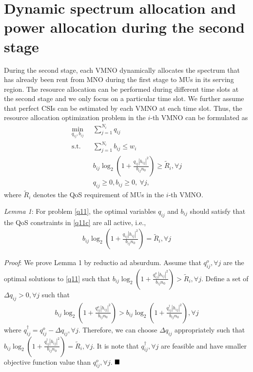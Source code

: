\documentclass[journal]{IEEEtran}
\begin{document}
\section{Dynamic spectrum allocation and power allocation during the second stage}
During the second stage, each VMNO dynamically allocates the spectrum that has already been rent from MNO during the first stage to MUs in its serving region. The resource allocation can be performed during different time slots at the second stage and we only focus on a particular time slot. We further assume that perfect CSIs can be estimated by each VMNO at each time slot. Thus, the resource allocation optimization problem in the $i$-th VMNO can be formulated as
\begin{subequations}\label{q11}
	\begin{align}
	\min_{q_{ij}, b_{ij}}\ & \sum\limits_{j = 1}^{N_i} q_{ij} \label{q11a} \\ \mbox{s.t.} \quad &  \sum\limits_{j = 1}^{N_i} b_{ij} \leq w_i \label{q11b} \\ \quad &  b_{ij}\log_2\left(1 + \frac{q_{ij}\left|h_{ij}\right|^2}{b_{ij}n_0}\right) \geq \tilde{R}_i, \forall j \label{q11c}\\
	& q_{ij} \geq 0, b_{ij} \geq 0, \ \forall j, \label{q11d}
	\end{align}
\end{subequations}
where $\tilde{R}_i$ denotes the QoS requirement of MUs in the $i$-th VMNO.

\textit{Lemma 1}: For problem \eqref{q11}, the optimal variables $q_{ij}$ and $b_{ij}$ should satisfy that the QoS constraints in \eqref{q11c} are all active, i.e., 
\begin{align}
b_{ij}\log_2\left(1 + \frac{q_{ij}\left|h_{ij}\right|^2}{b_{ij}n_0}\right) = \tilde{R}_i,  \forall j
\end{align}

\textit{Proof}:  
We prove Lemma 1 by reductio ad absurdum. Assume that $q_{ij}^o, \forall j$ are the optimal solutions to \eqref{q11} such that $b_{ij}\log_2\left(1 + \frac{q_{ij}^o\left|h_{ij}\right|^2}{b_{ij}n_0}\right) > \tilde{R}_i, \forall j$. Define a set of $\Delta q_{ij} > 0, \forall j$ such that 
\begin{align}
b_{ij}\log_2\left(1 + \frac{q_{ij}^o\left|h_{ij}\right|^2}{b_{ij}n_0}\right) > b_{ij}\log_2\left(1 + \frac{q_{ij}^\dag\left|h_{ij}\right|^2}{b_{ij}n_0}\right), \forall j
\end{align}
where $q_{ij}^\dag = q_{ij}^o - \Delta q_{ij}, \forall j$. Therefore, we can choose $\Delta q_{ij}$ appropriately such that $b_{ij}\log_2\left(1 + \frac{q_{ij}^\dag\left|h_{ij}\right|^2}{b_{ij}n_0}\right) = \tilde{R}_i, \forall j$. It is note that $q_{ij}^\dag, \forall j$ are feasible and have smaller objective function value than $q_{ij}^o, \forall j$.
$\hfill\blacksquare$
\end{document}
